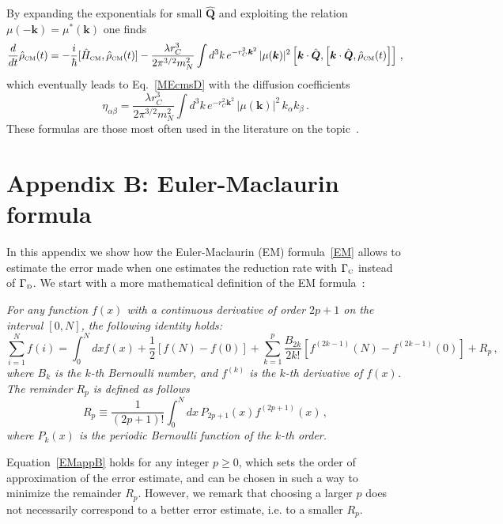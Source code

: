 \documentclass[11pt,onecolumn,amssymb,nofootinbib]{revtex4}
\newcommand\beq{\begin{equation}}
\newcommand\eeq{\end{equation}}
\newcommand\beqa{\begin{eqnarray}}
\newcommand\eeqa{\end{eqnarray}}
\newcommand\ro{\hat\rho}
\newcommand\Ho{\hat H}
\newcommand\bk{\boldsymbol{k}}
\newcommand\bQo{\hat{\boldsymbol{Q}}}
\begin{document}
By expanding the exponentials for small $\bQo$ and exploiting the relation $\mu(\boldsymbol{-k})=\mu^*(\boldsymbol{k})$ one finds
\beqa\label{lindmomapp}
\frac{d}{dt}\hat{\rho}_{\text{\tiny{CM}}}(t)=-\frac{i}{\hbar}[\Ho_{\text{\tiny{CM}}},\ro_{\text{\tiny{CM}}}(t)]-\frac{\lambda r_C^3}{2\pi^{3/2}m_N^2}\int d^3k\, e^{-r_C^2\boldsymbol{k}^2}\,|\mu(\boldsymbol{k})|^2\left[\bk\cdot\bQo,\left[\bk\cdot\bQo,\ro_{\text{\tiny{CM}}}(t)\right]\right]\,,
\eeqa
which eventually leads to Eq.~\eqref{MEcmsD} with the diffusion coefficients
\beq\label{etafour}
\eta_{\alpha\beta}=\frac{\lambda r_C^3}{2\pi^{3/2}m_N^2}\int d^3k\, e^{-r_C^2\boldsymbol{k}^2}\,|\mu(\boldsymbol{k})|^2\,k_\alpha k_\beta\,.
\eeq
These formulas are those most often used in the literature on the topic~\cite{NimHorHam14,Caretal16,Vinetal17,CarFerBas18}.

\section*{Appendix B: Euler-Maclaurin formula}
In this appendix we show how the Euler-Maclaurin (EM) formula~\eqref{EM} allows to estimate the error made when one estimates the reduction rate with $\Gamma_{\text{\tiny{C}}}$ instead of $\Gamma_{\text{\tiny{D}}}$. We start with a more mathematical definition of the EM formula~\cite{apostol}:

 \emph{For any function $f(x)$ with a continuous derivative of order $2p+1$ on the interval $[0,N]$, the following identity holds:
\beq\label{EMappB}
\sum_{i=1}^Nf(i)=\int_0^Ndx f(x)+\frac{1}{2}\left[f(N)-f(0)\right]+\sum_{k=1}^{p}\frac{B_{2k}}{2k!}\left[f^{(2k-1)}(N)-f^{(2k-1)}(0)\right]+R_p\,,
\eeq
where $B_k$ is the $k$-th Bernoulli number, and $f^{(k)}$ is the $k$-th derivative of $f(x)$. The reminder $R_p$ is defined as follows
\beq
R_p\equiv\frac{1}{(2p+1)!}\int_0^Ndx\,P_{2p+1}(x)f^{(2p+1)}(x)\,,
\eeq
where $P_k(x)$ is the periodic Bernoulli function of the $k$-th order.} 

Equation~\eqref{EMappB} holds for any integer $p\geq0$, which sets the order of approximation of the error estimate, and can be chosen in such a way to minimize the remainder $R_p$. 
However, we remark that choosing a larger $p$ does not necessarily correspond to a better error estimate, i.e. to a smaller $R_p$.
\end{document}
